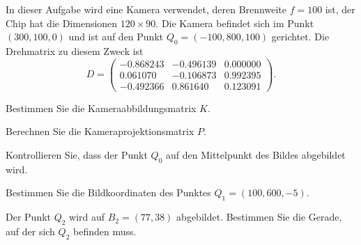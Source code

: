 In dieser Aufgabe wird eine Kamera verwendet, deren Brennweite $f=100$ ist,
der Chip hat die Dimensionen $120\times 90$.
Die Kamera befindet sich im Punkt $(300,100,0)$ und ist auf den Punkt
$Q_0=(-100,800,100)$ gerichtet.
Die Drehmatrix zu diesem Zweck ist 
\[
D=
\begin{pmatrix}
  -0.868243& -0.496139&  0.000000\\
   0.061070& -0.106873&  0.992395\\
  -0.492366&  0.861640&  0.123091
\end{pmatrix}.
\]
\begin{teilaufgaben}
\item Bestimmen Sie die Kameraabbildungsmatrix $K$.
\item Berechnen Sie die Kameraprojektionsmatrix $P$.
\item Kontrollieren Sie, dass der Punkt $Q_0$ auf den Mittelpunkt des
Bildes abgebildet wird.
\item Bestimmen Sie die Bildkoordinaten des Punktes
$Q_1 = (100,600,-5)$.
\item Der Punkt $Q_2$ wird auf $B_2=(77,38)$ abgebildet.
Bestimmen Sie die Gerade, auf der sich $Q_2$ befinden muss.
\end{teilaufgaben}


